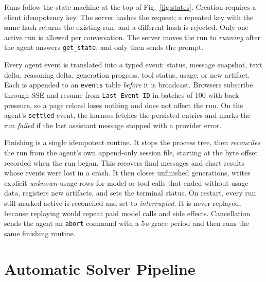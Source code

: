 \documentclass[conference]{IEEEtran}
\newcommand{\code}[1]{\texttt{\small #1}}
\begin{document}
Runs follow the state machine at the top of Fig.~\ref{fig:states}. Creation
requires a client idempotency key. The server hashes the request; a repeated
key with the same hash returns the existing run, and a different hash is
rejected. Only one active run is allowed per conversation. The server moves
the run to \emph{running} after the agent answers \code{get\_state}, and only
then sends the prompt.

Every agent event is translated into a typed event: status, message
snapshot, text delta, reasoning delta, generation progress, tool status,
usage, or new artifact. Each is appended to an \code{events} table
\emph{before} it is broadcast. Browsers subscribe through SSE and resume from
\code{Last-Event-ID} in batches of 100 with back-pressure, so a page reload
loses nothing and does not affect the run. On the agent's \code{settled}
event, the harness fetches the persisted entries and marks the run
\emph{failed} if the last assistant message stopped with a provider error.

Finishing is a single idempotent routine. It stops the process tree, then
\emph{reconciles} the run from the agent's own append-only session file,
starting at the byte offset recorded when the run began. This recovers final
messages and chart results whose events were lost in a crash. It then closes
unfinished generations, writes explicit \emph{unknown} usage rows for model
or tool calls that ended without usage data, registers new artifacts, and
sets the terminal status. On restart, every run still marked active is
reconciled and set to \emph{interrupted}. It is never replayed, because
replaying would repeat paid model calls and side effects. Cancellation sends
the agent an \code{abort} command with a 5\,s grace period and then runs the
same finishing routine.

\section{Automatic Solver Pipeline}
\label{sec:pipeline}
\end{document}
